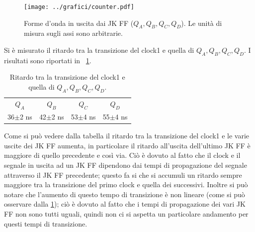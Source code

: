 \documentclass[a4paper,10pt]{article}
\begin{document}
\begin{figure}[H]
	\centering
	\texttt{[image: ../grafici/counter.pdf]}
	\caption{Forme d'onda in uscita dai JK FF ($Q_A,Q_B,Q_C,Q_D$). Le unità di misura sugli assi sono arbitrarie.}
	\label{fig:divisor}
\end{figure}



Si è misurato il ritardo tra la transizione del clock1 e quella di $Q_A,Q_B,Q_C,Q_D$. I risultati sono riportati in \tablename{~\ref{tab:time}}.

\begin{table}[H]
	\centering
	\begin{tabular}{cccc}
\hline
$Q_A$ & $Q_B$ & $Q_C$ & $Q_D$ \\
36$\pm$2 ns & 42$\pm$2 ns & 53$\pm$4 ns & 55$\pm$4 ns \\
\hline
	\end{tabular}
	\caption{Ritardo tra la transizione del clock1 e quella di $Q_A,Q_B,Q_C,Q_D$.}
	\label{tab:time}
\end{table}

Come si può vedere dalla tabella il ritardo tra la transizione del clock1 e le varie uscite dei JK FF aumenta, in particolare il ritardo all'uscita dell'ultimo JK FF è maggiore di quello precedente e così via. Ciò è dovuto al fatto che il clock e il segnale in uscita ad un JK FF dipendono dai tempi di propagazione del segnale attraverso il JK FF precedente; questo fa si che si accumuli un ritardo sempre maggiore tra la transizione del primo clock e quella dei successivi. Inoltre si può notare che l'aumento di questo tempo di transizione è non lineare (come si può osservare dalla \cref{tab:time}); ciò è dovuto al fatto che i tempi di propagazione dei vari JK FF non sono tutti uguali, quindi non ci si aspetta un particolare andamento per questi tempi di transizione. 
\end{document}
